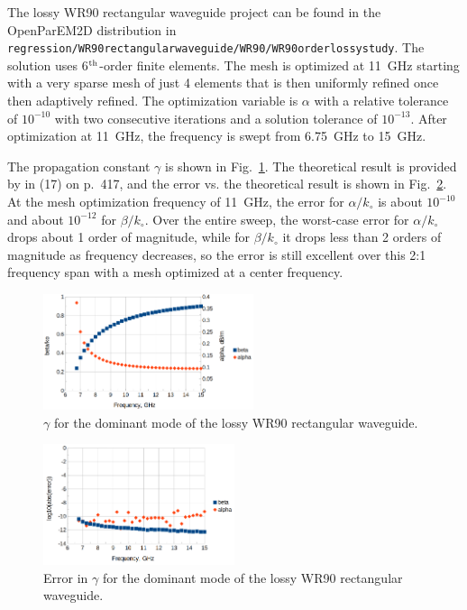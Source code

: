 \documentclass[titlepage]{article}
\renewcommand\_{\textunderscore\linebreak[1]}
\begin{document}
The lossy WR90 rectangular waveguide project can be found in the OpenParEM2D distribution in \texttt{regression/WR90\_rectangular\_waveguide/WR90/WR90\_order\_6\_lossy\_study}. The solution uses 6$^{\textnormal{th}}$-order finite elements. The mesh is optimized at 11~GHz starting with a very sparse mesh of just 4 elements that is then uniformly refined once then adaptively refined. The optimization variable is $\alpha$ with a relative tolerance of $10^{-10}$ with two consecutive iterations and a solution tolerance of $10^{-13}$. After optimization at 11~GHz, the frequency is swept from 6.75~GHz to 15~GHz.

The propagation constant $\gamma$ is shown in Fig.~\ref{fig:WR90_lossy_gamma}.  The theoretical result is provided by \cite{Ramo} in (17) on p.~417, and the error vs. the theoretical result is shown in Fig.~\ref{fig:WR90_lossy_gamma_error}.  At the mesh optimization frequency of 11~GHz, the error for $\alpha/k_{\circ}$ is about $10^{-10}$ and about $10^{-12}$ for $\beta/k_{\circ}$.  Over the entire sweep, the worst-case error for $\alpha/k_{\circ}$ drops about 1 order of magnitude, while for $\beta/k_{\circ}$ it drops less than 2 orders of magnitude as frequency decreases, so the error is still excellent over this 2:1 frequency span with a mesh optimized at a center frequency.

\begin{figure}[H]
  \centering
  \includegraphics[width=0.55\textwidth]{../regression/OpenParEM2D/WR90_rectangular_waveguide/WR90/WR90_order_6_lossy_study/screenshots/WR90_lossy_gamma}
  \caption{$\gamma$ for the dominant mode of the lossy WR90 rectangular waveguide.}
  \label{fig:WR90_lossy_gamma}
\end{figure}

\begin{figure}[H]
  \centering
  \includegraphics[width=0.5\textwidth]{../regression/OpenParEM2D/WR90_rectangular_waveguide/WR90/WR90_order_6_lossy_study/screenshots/WR90_lossy_gamma_error}
  \caption{Error in $\gamma$ for the dominant mode of the lossy WR90 rectangular waveguide.}
  \label{fig:WR90_lossy_gamma_error}
\end{figure}
\end{document}
